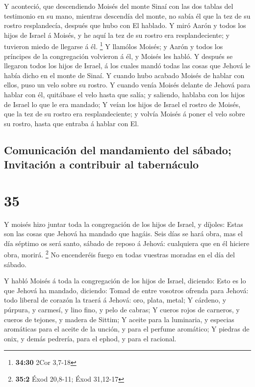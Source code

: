 Y aconteció, que descendiendo Moisés del monte Sinaí con
las dos tablas del testimonio en su mano, mientras descendía del monte,
no sabía él que la tez de su rostro resplandecía, después que hubo con
El hablado.  Y miró Aarón y todos los hijos de Israel á
Moisés, y he aquí la tez de su rostro era resplandeciente; y tuvieron
miedo de llegarse á él. \footnote{\textbf{34:30} 2Cor 3,7-18}
 Y llamólos Moisés; y Aarón y todos los príncipes de la
congregación volvieron á él, y Moisés les habló.  Y después
se llegaron todos los hijos de Israel, á los cuales mandó todas las
cosas que Jehová le había dicho en el monte de Sinaí.  Y
cuando hubo acabado Moisés de hablar con ellos, puso un velo sobre su
rostro.  Y cuando venía Moisés delante de Jehová para
hablar con él, quitábase el velo hasta que salía; y saliendo, hablaba
con los hijos de Israel lo que le era mandado;  Y veían los
hijos de Israel el rostro de Moisés, que la tez de su rostro era
resplandeciente; y volvía Moisés á poner el velo sobre su rostro, hasta
que entraba á hablar con El.

\hypertarget{comunicaciuxf3n-del-mandamiento-del-suxe1bado-invitaciuxf3n-a-contribuir-al-tabernuxe1culo}{%
\subsection{Comunicación del mandamiento del sábado; Invitación a
contribuir al
tabernáculo}\label{comunicaciuxf3n-del-mandamiento-del-suxe1bado-invitaciuxf3n-a-contribuir-al-tabernuxe1culo}}

\hypertarget{section-34}{%
\section{35}\label{section-34}}

 Y moisés hizo juntar toda la congregación de los hijos de
Israel, y díjoles: Estas son las cosas que Jehová ha mandado que hagáis.
 Seis días se hará obra, mas el día séptimo os será santo,
sábado de reposo á Jehová: cualquiera que en él hiciere obra, morirá.
\footnote{\textbf{35:2} Éxod 20,8-11; Éxod 31,12-17}  No
encenderéis fuego en todas vuestras moradas en el día del sábado.

 Y habló Moisés á toda la congregación de los hijos de
Israel, diciendo: Esto es lo que Jehová ha mandado, diciendo:
 Tomad de entre vosotros ofrenda para Jehová: todo liberal
de corazón la traerá á Jehová: oro, plata, metal;  Y
cárdeno, y púrpura, y carmesí, y lino fino, y pelo de cabras;
 Y cueros rojos de carneros, y cueros de tejones, y madera
de Sittim;  Y aceite para la luminaria, y especias
aromáticas para el aceite de la unción, y para el perfume aromático;
 Y piedras de onix, y demás pedrería, para el ephod, y para
el racional.

